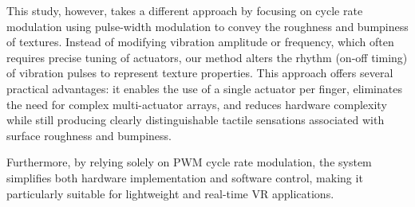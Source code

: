 This study, however, takes a different approach by focusing on cycle rate modulation using pulse-width modulation to convey the roughness and bumpiness of textures. Instead of modifying vibration amplitude or frequency, which often requires precise tuning of actuators, our method alters the rhythm (on-off timing) of vibration pulses to represent texture properties. This approach offers several practical advantages: it enables the use of a single actuator per finger, eliminates the need for complex multi-actuator arrays, and reduces hardware complexity while still producing clearly distinguishable tactile sensations associated with surface roughness and bumpiness. 

Furthermore, by relying solely on PWM cycle rate modulation, the system simplifies both hardware implementation and software control, making it particularly suitable for lightweight and real-time VR applications.

